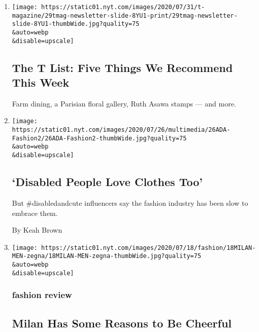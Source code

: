 \begin{enumerate}
\def\labelenumi{\arabic{enumi}.}
\item
  \href{/2020/07/30/t-magazine/the-t-list-five-things-we-recommend-this-week.html}{}

  \texttt{[image: https://static01.nyt.com/images/2020/07/31/t-magazine/29tmag-newsletter-slide-8YU1-print/29tmag-newsletter-slide-8YU1-thumbWide.jpg?quality=75\\\&auto=webp\\\&disable=upscale]}

  \hypertarget{the-t-list-five-things-we-recommend-this-week}{%
  \subsection{The T List: Five Things We Recommend This
  Week}\label{the-t-list-five-things-we-recommend-this-week}}

  Farm dining, a Parisian floral gallery, Ruth Asawa stamps --- and
  more.
\item
  \href{/2020/07/26/style/functional-fashion.html}{}

  \texttt{[image: https://static01.nyt.com/images/2020/07/26/multimedia/26ADA-Fashion2/26ADA-Fashion2-thumbWide.jpg?quality=75\\\&auto=webp\\\&disable=upscale]}

  \hypertarget{disabled-people-love-clothes-too}{%
  \subsection{`Disabled People Love Clothes
  Too'}\label{disabled-people-love-clothes-too}}

  But \#disabledandcute influencers say the fashion industry has been
  slow to embrace them.

  By Keah Brown
\item
  \href{/2020/07/17/style/mens-fashion-milan-provides-reasons-to-be-cheerful.html}{}

  \texttt{[image: https://static01.nyt.com/images/2020/07/18/fashion/18MILAN-MEN-zegna/18MILAN-MEN-zegna-thumbWide.jpg?quality=75\\\&auto=webp\\\&disable=upscale]}

  \hypertarget{fashion-review}{%
  \subsubsection{fashion review}\label{fashion-review}}

  \hypertarget{milan-has-some-reasons-to-be-cheerful}{%
  \subsection{Milan Has Some Reasons to Be
  Cheerful}\label{milan-has-some-reasons-to-be-cheerful}}


\end{enumerate}
